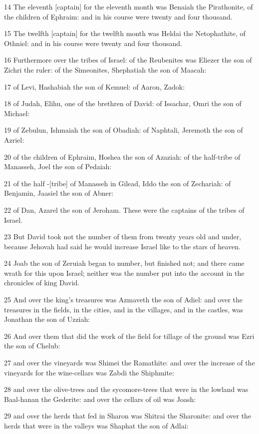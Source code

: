 \par 14 The eleventh [captain] for the eleventh month was Benaiah the Pirathonite, of the children of Ephraim: and in his course were twenty and four thousand.
\par 15 The twelfth [captain] for the twelfth month was Heldai the Netophathite, of Othniel: and in his course were twenty and four thousand.
\par 16 Furthermore over the tribes of Israel: of the Reubenites was Eliezer the son of Zichri the ruler: of the Simeonites, Shephatiah the son of Maacah:
\par 17 of Levi, Hashabiah the son of Kemuel: of Aaron, Zadok:
\par 18 of Judah, Elihu, one of the brethren of David: of Issachar, Omri the son of Michael:
\par 19 of Zebulun, Ishmaiah the son of Obadiah: of Naphtali, Jeremoth the son of Azriel:
\par 20 of the children of Ephraim, Hoshea the son of Azaziah: of the half-tribe of Manasseh, Joel the son of Pedaiah:
\par 21 of the half -[tribe] of Manasseh in Gilead, Iddo the son of Zechariah: of Benjamin, Jaasiel the son of Abner:
\par 22 of Dan, Azarel the son of Jeroham. These were the captains of the tribes of Israel.
\par 23 But David took not the number of them from twenty years old and under, because Jehovah had said he would increase Israel like to the stars of heaven.
\par 24 Joab the son of Zeruiah began to number, but finished not; and there came wrath for this upon Israel; neither was the number put into the account in the chronicles of king David.
\par 25 And over the king's treasures was Azmaveth the son of Adiel: and over the treasures in the fields, in the cities, and in the villages, and in the castles, was Jonathan the son of Uzziah:
\par 26 And over them that did the work of the field for tillage of the ground was Ezri the son of Chelub:
\par 27 and over the vineyards was Shimei the Ramathite: and over the increase of the vineyards for the wine-cellars was Zabdi the Shiphmite:
\par 28 and over the olive-trees and the sycomore-trees that were in the lowland was Baal-hanan the Gederite: and over the cellars of oil was Joash:
\par 29 and over the herds that fed in Sharon was Shitrai the Sharonite: and over the herds that were in the valleys was Shaphat the son of Adlai:
